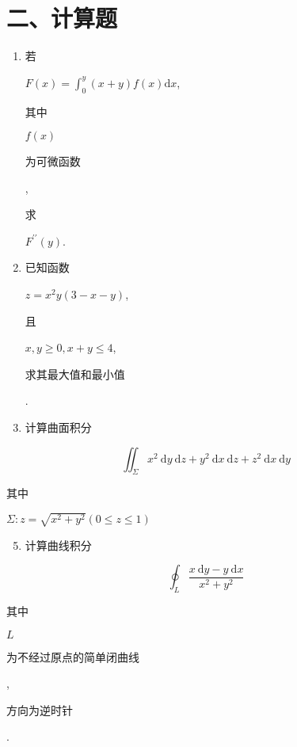 \documentclass[10pt]{article}
\begin{document}
\section{二、计算题}
\begin{enumerate}
  \item \begin{CJK}{UTF8}{mj}若\end{CJK} $F(x)=\int_{0}^{y}(x+y) f(x) \mathrm{d} x$, \begin{CJK}{UTF8}{mj}其中\end{CJK} $f(x)$ \begin{CJK}{UTF8}{mj}为可微函数\end{CJK}, \begin{CJK}{UTF8}{mj}求\end{CJK} $F^{\prime \prime}(y)$.

  \item \begin{CJK}{UTF8}{mj}已知函数\end{CJK} $z=x^{2} y(3-x-y)$, \begin{CJK}{UTF8}{mj}且\end{CJK} $x, y \geq 0, x+y \leq 4$, \begin{CJK}{UTF8}{mj}求其最大值和最小值\end{CJK}.

  \item \begin{CJK}{UTF8}{mj}计算曲面积分\end{CJK}

\end{enumerate}
$$
\iint_{\Sigma} x^{2} \mathrm{~d} y \mathrm{~d} z+y^{2} \mathrm{~d} x \mathrm{~d} z+z^{2} \mathrm{~d} x \mathrm{~d} y
$$
\begin{CJK}{UTF8}{mj}其中\end{CJK} $\Sigma: z=\sqrt{x^{2}+y^{2}}(0 \leq z \leq 1)$

\begin{enumerate}
  \setcounter{enumi}{4}
  \item \begin{CJK}{UTF8}{mj}计算曲线积分\end{CJK}
\end{enumerate}
$$
\oint_{L} \frac{x \mathrm{~d} y-y \mathrm{~d} x}{x^{2}+y^{2}}
$$
\begin{CJK}{UTF8}{mj}其中\end{CJK} $L$ \begin{CJK}{UTF8}{mj}为不经过原点的简单闭曲线\end{CJK}, \begin{CJK}{UTF8}{mj}方向为逆时针\end{CJK}.
\end{document}
